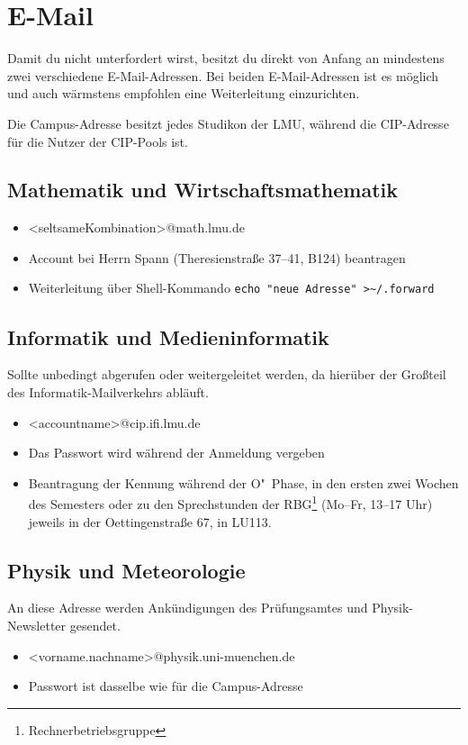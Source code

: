 \section{E-Mail}
Damit du nicht unterfordert wirst, besitzt du direkt von Anfang an mindestens zwei verschiedene E-Mail-Adressen. Bei beiden E-Mail-Adressen ist es möglich und auch wärmstens empfohlen eine Weiterleitung einzurichten.

Die Campus-Adresse besitzt jedes Studikon der LMU, während die CIP-Adresse für die Nutzer der CIP-Pools ist.


\subsection*{Mathematik und Wirtschaftsmathematik\subjectList{\subjectM\subjectW}}
\begin{itemize}
	\item <seltsameKombination>@math.lmu.de
	\item Account bei Herrn Spann (Theresienstraße 37--41, B124) beantragen
	\item Weiterleitung über Shell-Kommando \verb|echo "neue Adresse" >~/.forward|
\end{itemize}

\subsection*{Informatik und Medieninformatik \subjectList{\subjectI\subjectMI}}
Sollte unbedingt abgerufen oder weitergeleitet werden, da hierüber der Großteil des Informatik-Mailverkehrs abläuft. 
\begin{itemize}
	\item <accountname>@cip.ifi.lmu.de
	\item Das Passwort wird während der Anmeldung vergeben
	\item Beantragung der Kennung während der O"~Phase, in den ersten zwei Wochen des Semesters oder zu den Sprechstunden der RBG\footnote{Rechnerbetriebsgruppe} 
		(Mo--Fr, 13--17 Uhr) jeweils in der Oettingenstraße 67, in LU113.
\end{itemize}
\begin{urlList}
\end{urlList}

\subsection*{Physik und Meteorologie\subjectList{\subjectP}}
An diese Adresse werden Ankündigungen des Prüfungsamtes und
Physik-Newsletter gesendet.
\begin{itemize}
	\item <vorname.nachname>@physik.uni-muenchen.de
	\item Passwort ist dasselbe wie für die Campus-Adresse
\end{itemize}
\begin{urlList}
\end{urlList}

